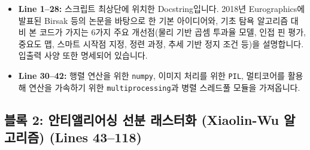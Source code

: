 \begin{itemize}
\item \textbf{Line 1--28:} 스크립트 최상단에 위치한 Docstring입니다. 2018년 Eurographics에 발표된 Birsak 등의 논문을 바탕으로 한 기본 아이디어와, 기초 탐욕 알고리즘 대비 본 코드가 가지는 6가지 주요 개선점(물리 기반 곱셈 투과율 모델, 인접 핀 평가, 중요도 맵, 스마트 시작점 지정, 정련 과정, 추세 기반 정지 조건 등)을 설명합니다. 입출력 사양 또한 명세되어 있습니다.
\item \textbf{Line 30--42:} 행렬 연산을 위한 \texttt{numpy}, 이미지 처리를 위한 \texttt{PIL}, 멀티코어를 활용해 연산을 가속하기 위한 \texttt{multiprocessing}과 병렬 스레드풀 모듈을 가져옵니다.
\end{itemize}

\subsection*{블록 2: 안티앨리어싱 선분 래스터화 (Xiaolin-Wu 알고리즘) (Lines 43--118)}
